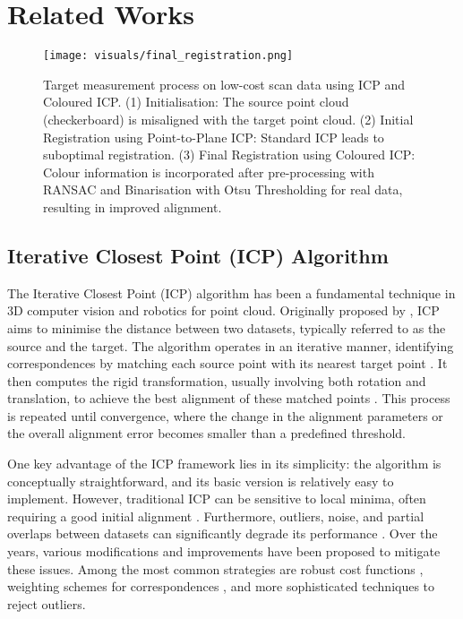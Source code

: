 \section{Related Works}
\label{RELATED_WORKS}
\begin{figure*}[t]
  \centering
    \texttt{[image: visuals/final\_registration.png]}
    \caption{Target measurement process on low-cost scan data using ICP and Coloured ICP. (1) Initialisation: The source point cloud (checkerboard) is misaligned with the target point cloud. (2) Initial Registration using Point-to-Plane ICP: Standard ICP leads to suboptimal registration. (3) Final Registration using Coloured ICP: Colour information is incorporated after pre-processing with RANSAC and Binarisation with Otsu Thresholding for real data, resulting in improved alignment.}
    \label{fig:Registration_visualisation}
\end{figure*}

\subsection{Iterative Closest Point (ICP) Algorithm}
The Iterative Closest Point (ICP) algorithm has been a fundamental technique in 3D computer vision and robotics for point cloud. Originally proposed by \cite{besl_method_1992}, ICP aims to minimise the distance between two datasets, typically referred to as the source and the target. The algorithm operates in an iterative manner, identifying correspondences by matching each source point with its nearest target point \citep{survey_ICP}. It then computes the rigid transformation, usually involving both rotation and translation, to achieve the best alignment of these matched points \citep{survey_ICP}. This process is repeated until convergence, where the change in the alignment parameters or the overall alignment error becomes smaller than a predefined threshold.

One key advantage of the ICP framework lies in its simplicity: the algorithm is conceptually straightforward, and its basic version is relatively easy to implement. However, traditional ICP can be sensitive to local minima, often requiring a good initial alignment \citep{zhang2021fast}. Furthermore, outliers, noise, and partial overlaps between datasets can significantly degrade its performance \citep{zhang2021fast, bouaziz2013sparse}. Over the years, various modifications and improvements \citep{gelfand2005robust, rusu2009fast, aiger20084, gruen2005least, fitzgibbon2003robust} have been proposed to mitigate these issues. Among the most common strategies are robust cost functions \citep{fitzgibbon2003robust}, weighting schemes for correspondences \citep{rusu2009fast}, and more sophisticated techniques \citep{gelfand2005robust, bouaziz2013sparse} to reject outliers. 

